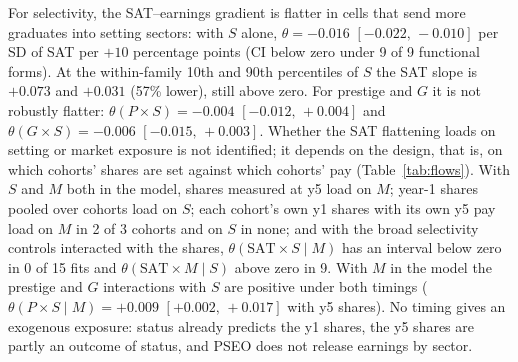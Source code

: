 \documentclass[11pt]{article}
\newcommand{\ci}[2]{$[#1,\allowbreak\,#2]$}
\begin{document}
For selectivity, the SAT--earnings gradient is flatter in cells that send more graduates into setting sectors: with $S$ alone,
$\theta=-0.016$ \ci{-0.022}{-0.010} per SD of SAT per $+10$ percentage points (CI below zero under 9 of 9 functional forms). At the
within-family 10th and 90th percentiles of $S$ the SAT slope is $+0.073$ and $+0.031$ (57\% lower), still above zero. For prestige
and $G$ it is not robustly flatter: $\theta(P\times S)=-0.004$ \ci{-0.012}{+0.004} and $\theta(G\times S)=-0.006$ \ci{-0.015}{+0.003}. Whether the
SAT flattening loads on setting or market exposure is not identified; it depends on the design, that is, on
which cohorts' shares are set against which cohorts' pay (Table~\ref{tab:flows}). With $S$ and $M$ both in the model, shares measured at y5 load on $M$; year-1 shares pooled over cohorts
load on $S$; each cohort's own y1 shares with its own y5 pay load on $M$ in 2 of 3 cohorts and on $S$ in none; and with the broad
selectivity controls interacted with the shares, $\theta(\text{SAT}\times S\mid M)$ has an interval below zero in 0 of 15 fits and
$\theta(\text{SAT}\times M\mid S)$ above zero in 9. With $M$ in the model the prestige and $G$ interactions with $S$ are positive under
both timings ($\theta(P\times S\mid M)=+0.009$ \ci{+0.002}{+0.017} with y5 shares). No timing gives an exogenous exposure: status
already predicts the y1 shares, the y5 shares are partly an outcome of status, and PSEO does not release earnings by sector.
\end{document}
